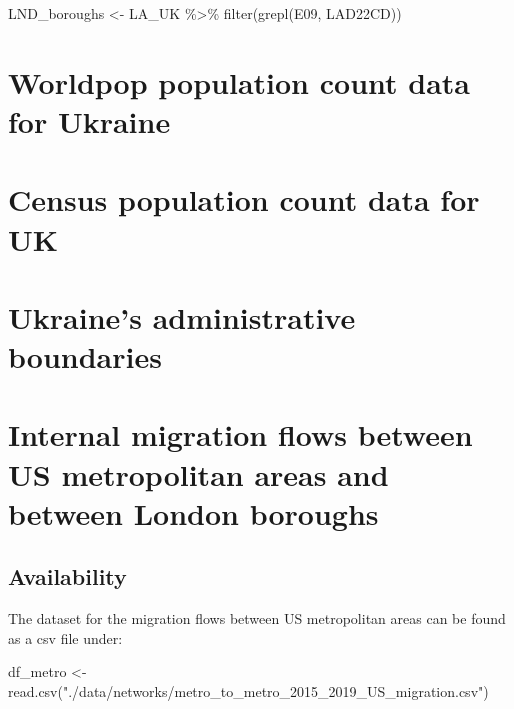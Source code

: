 \documentclass[
  letterpaper,
  DIV=11,
  numbers=noendperiod]{scrreprt}
\newenvironment{Shaded}{\begin{snugshade}}{\end{snugshade}}
\newcommand{\FunctionTok}[1]{\textcolor[rgb]{0.28,0.35,0.67}{#1}}
\newcommand{\NormalTok}[1]{\textcolor[rgb]{0.00,0.23,0.31}{#1}}
\newcommand{\OtherTok}[1]{\textcolor[rgb]{0.00,0.23,0.31}{#1}}
\newcommand{\SpecialCharTok}[1]{\textcolor[rgb]{0.37,0.37,0.37}{#1}}
\newcommand{\StringTok}[1]{\textcolor[rgb]{0.13,0.47,0.30}{#1}}
\begin{document}
\begin{Shaded}
\begin{Highlighting}[]
\NormalTok{LND\_boroughs }\OtherTok{\textless{}{-}}\NormalTok{ LA\_UK }\SpecialCharTok{\%\textgreater{}\%} \FunctionTok{filter}\NormalTok{(}\FunctionTok{grepl}\NormalTok{(}\StringTok{\textquotesingle{}E09\textquotesingle{}}\NormalTok{, LAD22CD)) }
\end{Highlighting}
\end{Shaded}

\hypertarget{worldpop-population-count-data-for-ukraine}{%
\section{Worldpop population count data for
Ukraine}\label{worldpop-population-count-data-for-ukraine}}

\hypertarget{census-population-count-data-for-uk}{%
\section{Census population count data for
UK}\label{census-population-count-data-for-uk}}

\hypertarget{ukraines-administrative-boundaries}{%
\section{Ukraine's administrative
boundaries}\label{ukraines-administrative-boundaries}}

\hypertarget{internal-migration-flows-between-us-metropolitan-areas-and-between-london-boroughs}{%
\section{Internal migration flows between US metropolitan areas and
between London
boroughs}\label{internal-migration-flows-between-us-metropolitan-areas-and-between-london-boroughs}}

\hypertarget{availability-2}{%
\subsection*{Availability}\label{availability-2}}

The dataset for the migration flows between US metropolitan areas can be
found as a csv file under:

\begin{Shaded}
\begin{Highlighting}[]
\NormalTok{df\_metro }\OtherTok{\textless{}{-}} \FunctionTok{read.csv}\NormalTok{(}\StringTok{"./data/networks/metro\_to\_metro\_2015\_2019\_US\_migration.csv"}\NormalTok{)}
\end{Highlighting}
\end{Shaded}
\end{document}
